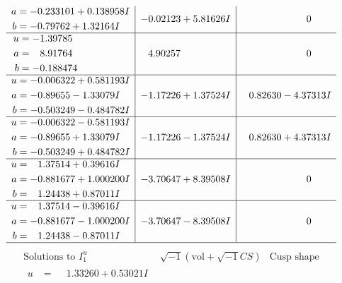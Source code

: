 \documentclass[1p]{elsarticle_modified}
\theoremstyle{definition}
\newcommand{\I}{\sqrt{-1}}
\begin{document}
$$\begin{array}{c|c|c}
\begin{aligned}
a &= -0.233101 + 0.138958 I \\
b &= -0.79762 + 1.32164 I\end{aligned}
 & -0.02123 + 5.81626 I & \phantom{-0.000000 } 0 \\ \hline\begin{aligned}
u &= -1.39785\phantom{ +0.000000I} \\
a &= \phantom{-}8.91764\phantom{ +0.000000I} \\
b &= -0.188474\phantom{ +0.000000I}\end{aligned}
 & \phantom{-}4.90257\phantom{ +0.000000I} & \phantom{-0.000000 } 0 \\ \hline\begin{aligned}
u &= -0.006322 + 0.581193 I \\
a &= -0.89655 - 1.33079 I \\
b &= -0.503249 - 0.484782 I\end{aligned}
 & -1.17226 + 1.37524 I & \phantom{-}0.82630 - 4.37313 I \\ \hline\begin{aligned}
u &= -0.006322 - 0.581193 I \\
a &= -0.89655 + 1.33079 I \\
b &= -0.503249 + 0.484782 I\end{aligned}
 & -1.17226 - 1.37524 I & \phantom{-}0.82630 + 4.37313 I \\ \hline\begin{aligned}
u &= \phantom{-}1.37514 + 0.39616 I \\
a &= -0.881677 + 1.000200 I \\
b &= \phantom{-}1.24438 + 0.87011 I\end{aligned}
 & -3.70647 + 8.39508 I & \phantom{-0.000000 } 0 \\ \hline\begin{aligned}
u &= \phantom{-}1.37514 - 0.39616 I \\
a &= -0.881677 - 1.000200 I \\
b &= \phantom{-}1.24438 - 0.87011 I\end{aligned}
 & -3.70647 - 8.39508 I & \phantom{-0.000000 } 0\\
 \hline 
 \end{array}$$\newpage$$\begin{array}{c|c|c}  
\text{Solutions to }I^u_{1}& \I (\text{vol} + \sqrt{-1}CS) & \text{Cusp shape}\\
 \hline 
\begin{aligned}
u &= \phantom{-}1.33260 + 0.53021 I \\

\end{aligned}
\end{array}$$
\end{document}
